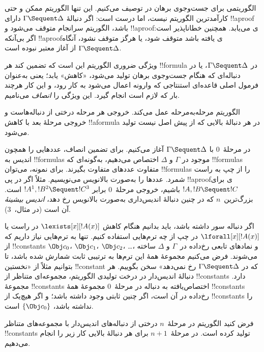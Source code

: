 \documentclass[../../../include/open-logic-section]{subfiles}
\begin{document}


الگوریتمی برای جست‌وجوی برهان در  توصیف می‌کنیم. این تنها
الگوریتم ممکن و حتی کارآمدترین الگوریتم نیست، اما درست است: اگر
دنبالهٔ $\Gamma \Sequent \Delta$ دارای !!a{proof} باشد، الگوریتم
سرانجام متوقف می‌شود و !!a{proof}ی می‌یابد. همچنین خطاناپذیر است: اگر
بی‌آنکه !!a{proof}ی یافته باشد متوقف شود، یا هرگز متوقف نشود، آنگاه
$\Gamma \Sequent \Delta$ از آغاز معتبر نبوده است.

ویژگی ضروری الگوریتم این است که تضمین کند هر !!{formula} در
$\Gamma \Sequent \Delta$، یا در دنباله‌ای که هنگام جست‌وجوی برهان
تولید می‌شود، «کاهش» یابد؛ یعنی به‌عنوان فرمول اصلی قاعده‌ای استنتاجی
که وارونه اعمال می‌شود به کار رود، و این کار هرچند بار که لازم است
انجام گیرد. این ویژگی را \emph{انصاف} می‌نامیم.

الگوریتم مرحله‌به‌مرحله عمل می‌کند. خروجی هر مرحله درختی از دنباله‌هاست
و خروجی مرحلهٔ بعد با کاهش !!a{formula} در هر دنبالهٔ بالایی که از پیش
اصل نیست تولید می‌شود.

در مرحلهٔ~$0$ با $\Gamma \Sequent \Delta$ آغاز می‌کنیم. برای تضمین
انصاف، عددهایی را همچون اندیس به !!{formula}s موجود در $\Gamma$ و $\Delta$
اختصاص می‌دهیم، به‌گونه‌ای که !!{formula}s متفاوت عددهای متفاوت
بگیرند. برای نمونه، می‌توان !!{formula}s را از چپ به راست شمرد. عددها را
به‌صورت بالانویس می‌نویسیم. مثلاً اگر در پی !!a{proof}ی برای
$!A, !B \Sequent !C$ باشیم، خروجی مرحلهٔ~$0$ برابر
$!A^1, !B^2 \Sequent !C^3$ است. بزرگ‌ترین~$n$ که در چنین دنبالهٔ
اندیس‌داری به‌صورت بالانویس رخ دهد، \emph{اندیس بیشینهٔ} آن است
(در مثال،~$3$).

اگر دنباله سور داشته باشد، باید بدانیم هنگام کاهش
$\lexists[x][!A(x)]$ در راست یا $\lforall[x][!A(x)]$ در چپ از چه
ترم‌هایی استفاده کنیم. تنها به ترم‌هایی نیاز داریم که از
!!{constant}s $\Obj c_0$، $\Obj c_1$، $\Obj c_2$، \dots، و نمادهای
تابعی رخ‌داده در~$\Gamma$ و $\Delta$ ساخته می‌شوند. فرض می‌کنیم مجموعهٔ
همهٔ این ترم‌ها به ترتیبی ثابت شمارش شده باشد، تا بتوانیم مثلاً از
«نخستین !!{constant} که در $\Gamma \Sequent \Delta$ رخ نمی‌دهد» سخن
بگوییم. هر دنبالهٔ اندیس‌دار در درخت تولیدی الگوریتم، مجموعه‌ای متناظر
از !!{constant}s دارد. مجموعهٔ !!{constant}s اختصاص‌یافته به دنباله
در مرحلهٔ~$0$ مجموعهٔ همهٔ !!{constant}s رخ‌داده در آن است، اگر
چنین ثابتی وجود داشته باشد؛ و اگر هیچ‌یک از !!{constant}s را نداشته باشد،
$\{\Obj c_0\}$ است.

فرض کنید الگوریتم در مرحلهٔ~$n$ درختی از دنباله‌های اندیس‌دار با
مجموعه‌های متناظر !!{constant}s تولید کرده است. در مرحلهٔ~$n+1$ برای هر
دنبالهٔ بالایی کار زیر را انجام می‌دهیم.
\end{document}

